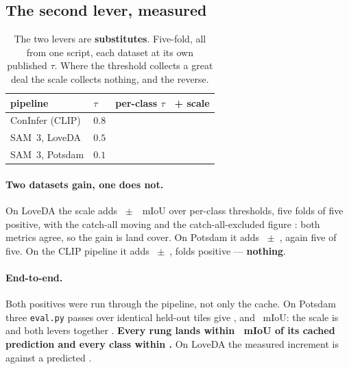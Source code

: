 \documentclass[10pt,a4paper]{article}                        %
\newcommand{\best}[1]{\textbf{#1}}
\begin{document}
\subsection{The second lever, measured}
\label{sec:scaleresults}

\begin{table}[t]\centering
\caption{The two levers are \textbf{substitutes}. Five-fold, all from one script,
each dataset at its own published $\tau$. Where the threshold collects a great
deal the scale collects nothing, and the reverse.}
\label{tab:levers}
\small
\begin{tabular}{llrr}
\toprule
pipeline & $\tau$ & per-class $\tau$ & \;+ scale \\
\midrule
ConInfer (CLIP) & $0.8$ & \best{\subCItau{}} & \scCI{} \\
SAM~3, LoveDA   & $0.5$ & \subLovetau{} & \scLove{} \\
SAM~3, Potsdam  & $0.1$ & \subPotstau{} & \best{\scPots{}} \\
\bottomrule
\end{tabular}
\end{table}

\paragraph{Two datasets gain, one does not.} On LoveDA the scale adds
\scLove{}~$\pm$~\scLoveSD{}~mIoU over per-class thresholds, five folds of five
positive, with the catch-all moving \scLoveBg{} and the catch-all-excluded figure
\scLoveExcl{}: both metrics agree, so the gain is land cover. On Potsdam it adds
\scPots{}~$\pm$~\scPotsSD{}, again five of five. On the CLIP pipeline it adds
\scCI{}~$\pm$~\scCISD{}, \scCIfolds{} folds positive --- \best{nothing}.

\paragraph{End-to-end.} Both positives were run through the pipeline, not only the
cache. On Potsdam three \texttt{eval.py} passes over identical held-out tiles give
\eePotsA{}, \eePotsB{} and \eePotsC{}~mIoU: the scale is \eePotsScale{} and both
levers together \eePotsTotal{}. \best{Every rung lands within \eePotsMiss{}~mIoU of
its cached prediction and every class within \eePotsClassMiss{}.} On LoveDA the
measured increment is \eeScaleLove{} against a predicted \eeScaleLovePred{}.
\end{document}
